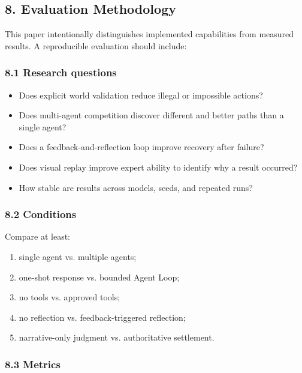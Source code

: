 \documentclass[
]{article}
\providecommand{\tightlist}{%
  \setlength{\itemsep}{0pt}\setlength{\parskip}{0pt}}
\begin{document}
\subsection{8. Evaluation Methodology}\label{8-evaluation-methodology}

This paper intentionally distinguishes implemented capabilities from
measured results. A reproducible evaluation should include:

\subsubsection{8.1 Research questions}\label{81-research-questions}

\begin{itemize}
\tightlist
\item
  Does explicit world validation reduce illegal or impossible actions?
\item
  Does multi-agent competition discover different and better paths than
  a single agent?
\item
  Does a feedback-and-reflection loop improve recovery after failure?
\item
  Does visual replay improve expert ability to identify why a result
  occurred?
\item
  How stable are results across models, seeds, and repeated runs?
\end{itemize}

\subsubsection{8.2 Conditions}\label{82-conditions}

Compare at least:

\begin{enumerate}
\def\labelenumi{\arabic{enumi}.}
\tightlist
\item
  single agent vs. multiple agents;
\item
  one-shot response vs. bounded Agent Loop;
\item
  no tools vs. approved tools;
\item
  no reflection vs. feedback-triggered reflection;
\item
  narrative-only judgment vs. authoritative settlement.
\end{enumerate}

\subsubsection{8.3 Metrics}\label{83-metrics}
\end{document}
